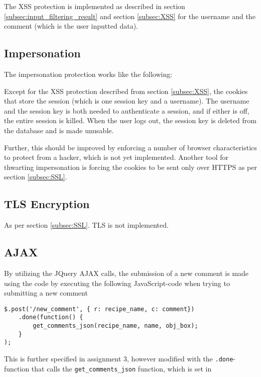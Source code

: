 \documentclass[a4paper]{scrartcl}
\begin{document}
The XSS protection is implemented as described in section \ref{subsec:input_filtering_result} and section \ref{subsec:XSS} for the username and the comment (which is the user inputted data).

\subsection{Impersonation}

The impersonation protection works like the following:

Except for the XSS protection described from section \ref{subsec:XSS}, the cookies that store the session (which is one session key and a username). The username and the session key is both needed to authenticate a session, and if either is off, the entire session is killed. When the user logs out, the session key is deleted from the database and is made unusable.

Further, this should be improved by enforcing a number of browser characteristics to protect from a hacker, which is not yet implemented. Another tool for thwarting impersonation is forcing the cookies to be sent only over HTTPS as per section \ref{subsec:SSL}.

\subsection{TLS Encryption}

As per section \ref{subsec:SSL}. TLS is not implemented.

\subsection{AJAX}

By utilizing the JQuery AJAX calls, the submission of a new comment is made using the code by executing the following JavaScript-code when trying to submitting a new comment

\begin{lstlisting}
$.post('/new_comment', { r: recipe_name, c: comment})
	.done(function() {
		get_comments_json(recipe_name, name, obj_box);
	}
);
\end{lstlisting}

This is further specified in assignment 3, however modified with the \texttt{.done}-function that calls the \texttt{get\_comments\_json} function, which is set in
\end{document}

